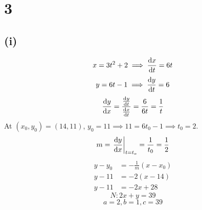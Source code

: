 \documentclass[a4paper,12pt]{article}
\begin{document}
\section*{3}
\subsection*{(i)}
\[x=3t^2+2\implies\dv{x}{t}=6t\]
\[y=6t-1\implies\dv{y}{t}=6\]
\[\dv{y}{x}=\frac{\dv{y}{t}}{\dv{x}{t}}=\frac6{6t}=\frac1t\]
At \((x_0,y_0)=(14,11)\), \(y_0=11\implies11=6t_0-1\implies t_0=2\).
\[m=\eval{\dv{y}{x}}_{t=t_o}=\frac1{t_0}=\frac12\]
\[\begin{aligned}
    y-y_0&=-\frac1m(x-x_0)\\
    y-11&=-2(x-14)\\
    y-11&=-2x+28
\end{aligned}\]
\[N:\boxed{2x+y=39}\]
\[a=\boxed2,b=\boxed1,c=\boxed{39}\]
\end{document}
